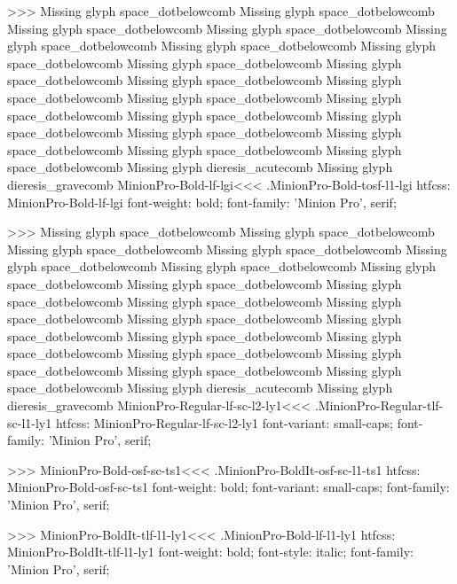 {>>>
Missing glyph	space_dotbelowcomb
Missing glyph	space_dotbelowcomb
Missing glyph	space_dotbelowcomb
Missing glyph	space_dotbelowcomb
Missing glyph	space_dotbelowcomb
Missing glyph	space_dotbelowcomb
Missing glyph	space_dotbelowcomb
Missing glyph	space_dotbelowcomb
Missing glyph	space_dotbelowcomb
Missing glyph	space_dotbelowcomb
Missing glyph	space_dotbelowcomb
Missing glyph	space_dotbelowcomb
Missing glyph	space_dotbelowcomb
Missing glyph	space_dotbelowcomb
Missing glyph	space_dotbelowcomb
Missing glyph	space_dotbelowcomb
Missing glyph	space_dotbelowcomb
Missing glyph	space_dotbelowcomb
Missing glyph	space_dotbelowcomb
Missing glyph	dieresis_acutecomb
Missing glyph	dieresis_gravecomb
\<MinionPro-Bold-lf-lgi\><<<
.MinionPro-Bold-tosf-l1-lgi
htfcss:  MinionPro-Bold-lf-lgi  font-weight: bold; font-family: 'Minion Pro', serif;

>>>
Missing glyph	space_dotbelowcomb
Missing glyph	space_dotbelowcomb
Missing glyph	space_dotbelowcomb
Missing glyph	space_dotbelowcomb
Missing glyph	space_dotbelowcomb
Missing glyph	space_dotbelowcomb
Missing glyph	space_dotbelowcomb
Missing glyph	space_dotbelowcomb
Missing glyph	space_dotbelowcomb
Missing glyph	space_dotbelowcomb
Missing glyph	space_dotbelowcomb
Missing glyph	space_dotbelowcomb
Missing glyph	space_dotbelowcomb
Missing glyph	space_dotbelowcomb
Missing glyph	space_dotbelowcomb
Missing glyph	space_dotbelowcomb
Missing glyph	space_dotbelowcomb
Missing glyph	space_dotbelowcomb
Missing glyph	space_dotbelowcomb
Missing glyph	dieresis_acutecomb
Missing glyph	dieresis_gravecomb
\<MinionPro-Regular-lf-sc-l2-ly1\><<<
.MinionPro-Regular-tlf-sc-l1-ly1
htfcss:  MinionPro-Regular-lf-sc-l2-ly1  font-variant: small-caps; font-family: 'Minion Pro', serif;

>>>
\<MinionPro-Bold-osf-sc-ts1\><<<
.MinionPro-BoldIt-osf-sc-l1-ts1
htfcss:  MinionPro-Bold-osf-sc-ts1  font-weight: bold; font-variant: small-caps; font-family: 'Minion Pro', serif;

>>>
\<MinionPro-BoldIt-tlf-l1-ly1\><<<
.MinionPro-Bold-lf-l1-ly1
htfcss:  MinionPro-BoldIt-tlf-l1-ly1  font-weight: bold; font-style: italic; font-family: 'Minion Pro', serif;

}
